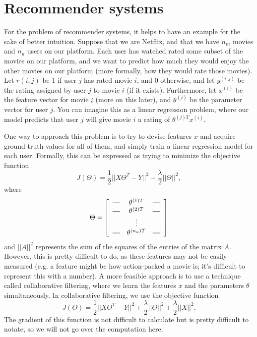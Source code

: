 \documentclass{article}
\newcommand*{\horzbar}{\rule[.5ex]{2.5ex}{0.5pt}}
\begin{document}
\section{Recommender systems}
For the problem of recommender systems, it helps to have an example for the sake of better intuition. Suppose that we are Netflix, and that we have $n_m$ movies and $n_u$ users on our platform. Each user has watched rated some subset of the movies on our platform, and we want to predict how much they would enjoy the other movies on our platform (more formally, how they would rate those movies). Let $r(i, j)$ be 1 if user $j$ has rated movie $i$, and 0 otherwise, and let $y^{(i, j)}$ be the rating assigned by user $j$ to movie $i$ (if it exists). Furthermore, let $x^{(i)}$ be the feature vector for movie $i$ (more on this later), and $\theta^{(j)}$ be the parameter vector for user $j$. You can imagine this as a linear regression problem, where our model predicts that user $j$ will give movie $i$ a rating of $\theta^{(j)T}x^{(i)}$.

One way to approach this problem is to try to devise features $x$ and acquire ground-truth values for all of them, and simply train a linear regression model for each user. Formally, this can be expressed as trying to minimize the objective function
$$J(\Theta) = \frac{1}{2}||X\Theta^T - Y||^2 + \frac{\lambda}{2}||\Theta||^2,$$
where
$$\Theta = \left[
\begin{array}{ccc}
\horzbar & \theta^{(1)T} & \horzbar \\
\horzbar & \theta^{(2)T} & \horzbar \\
& \vdots & \\
\horzbar & \theta^{(n_u)T} & \horzbar \\
\end{array}
\right]$$
and $||A||^2$ represents the sum of the squares of the entries of the matrix $A$.
However, this is pretty difficult to do, as these features may not be easily measured (e.g. a feature might be how action-packed a movie is; it's difficult to represent this with a number). A more feasible approach is to use a technique called collaborative filtering, where we learn the features $x$ and the parameters $\theta$ simultaneously. In collaborative filtering, we use the objective function
$$J(\Theta) = \frac{1}{2}||X\Theta^T - Y||^2 + \frac{\lambda}{2}||\Theta||^2 + \frac{\lambda}{2}||X||^2.$$
The gradient of this function is not difficult to calculate but is pretty difficult to notate, so we will not go over the computation here.
\end{document}
